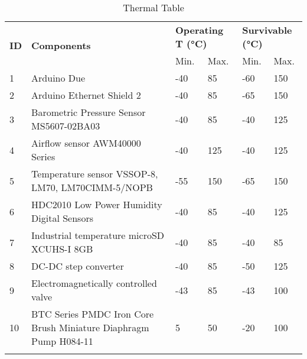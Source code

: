 
\begin{longtable}{|m{1cm}|m{3.5cm}|m{1cm}|m{1cm}|m{1cm}|m{1cm}|}
\hline
\multirow{2}{*}{\textbf{ID}} & \multirow{2}{*}{\textbf{Components}}                                 & \multicolumn{2}{l|}{\textbf{Operating T (°C)}} & \multicolumn{2}{l|}{\textbf{Survivable (°C)}} \\ \cline{3-6} 
                             &                                                                      & Min.                   & Max.                  & Min.                  & Max.                  \\ \hline
1                            & Arduino Due                                                          & -40                    & 85                    & -60                   & 150                   \\ \hline
2                            & Arduino Ethernet Shield 2                                            & -40                    & 85                    & -65                   & 150                   \\ \hline
3                            & Barometric Pressure Sensor MS5607-02BA03                             & -40                    & 85                    & -40                   & 125                   \\ \hline
4                            & Airflow sensor AWM40000 Series                                       & -40                    & 125                   & -40                   & 125                   \\ \hline
5                            & Temperature sensor VSSOP-8, LM70, LM70CIMM-5/NOPB & -55                    & 150                   & -65                   & 150                   \\ \hline
6                           & HDC2010 Low Power Humidity Digital Sensors                           & -40                    & 85                    & -40                   & 125                   \\ \hline
7                            & Industrial temperature microSD XCUHS-I 8GB                           & -40                    & 85                    & -40                   & 85                    \\ \hline
8                            & DC-DC step converter                                                 & -40                       & 85                       & -50                      & 125                      \\ \hline
9                           & Electromagnetically controlled valve                                 &  -43                      & 85              & -43                      & 100                      \\ \hline
10                           & BTC Series PMDC Iron Core Brush Miniature Diaphragm Pump H084-11                                                            & 5                      & 50                      & -20                    & 100                      \\ \hline

\caption{Thermal Table}
\label{tab:thermal-table}
\end{longtable}
\raggedbottom